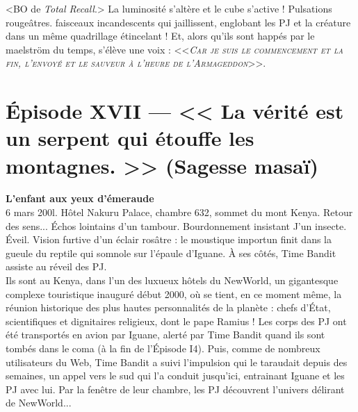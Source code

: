 \documentclass[11pt,twoside,a4paper]{book}
\begin{document}
<BO de \emph{Total Recall}.> La luminosit{\'e} s'alt{\`e}re et le cube s'active ! Pulsations rouge{\^a}tres. faisceaux incandescents qui jaillissent, englobant les PJ et la cr{\'e}ature dans un m{\^e}me quadrillage {\'e}tincelant ! Et, alors qu'ils sont happ{\'e}s par le maelstr{\"o}m du temps, s'{\'e}l{\`e}ve une voix : <<\emph{\textsc{Car je suis le commencement et la fin, l'envoy{\'e} et le sauveur {\`a} l'heure de l'Armageddon}}>>.~\\

\clearpage

\section*{{\'E}pisode XVII --- << \textbf{La v{\'e}rit{\'e} est un serpent qui {\'e}touffe les montagnes. } >> (Sagesse masa{\"i})}


\textbf{\large L'enfant aux yeux d'{\'e}meraude}~\\

6 mars 200l. H{\^o}tel Nakuru Palace, chambre 632, sommet du mont Kenya. Retour des sens... {\'E}chos lointains d'un tambour. Bourdonnement insistant J'un insecte. {\'E}veil. Vision furtive d'un {\'e}clair ros{\^a}tre : le moustique importun finit dans la gueule du reptile qui somnole sur l'{\'e}paule d'Iguane. {\`A} ses c{\^o}t{\'e}s, Time Bandit assiste au r{\'e}veil des PJ.~\\

Ils sont au Kenya, dans l'un des luxueux h{\^o}tels du NewWorld, un gigantesque complexe touristique inaugur{\'e} d{\'e}but 2000, o{\`u} se tient, en ce moment m{\^e}me, la r{\'e}union historique des plus hautes personnalit{\'e}s de la plan{\`e}te : chefs d'{\'E}tat, scientifiques et dignitaires religieux, dont le pape Ramius ! Les corps des PJ ont {\'e}t{\'e} transport{\'e}s en avion par Iguane, alert{\'e} par Time Bandit quand ils sont tomb{\'e}s dans le coma ({\`a} la fin de l'{\'E}pisode I4). Puis, comme de nombreux utilisateurs du Web, Time Bandit a suivi l'impulsion qui le taraudait depuis des semaines, un appel vers le sud qui l'a conduit jusqu'ici, entrainant Iguane et les PJ avec lui. Par la fen{\^e}tre de leur chambre, les PJ d{\'e}couvrent l'univers d{\'e}lirant de NewWorld...~\\
\end{document}
